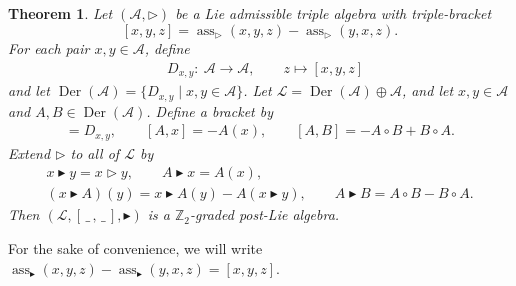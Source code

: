 \documentclass[10pt,a4paper]{amsart}
\newcommand{\Der}{\operatorname{Der}}
\newcommand{\noarg}{\,\_\,}
\numberwithin{equation}{section}
\newtheorem{Theorem}{Theorem}[section]
\begin{document}
\begin{Theorem}\label{th:pL_emb}
Let $(\mathcal{A},\rhd)$ be a Lie admissible triple algebra with triple-bracket
\[
[x,y,z] = \operatorname{ass}_{\rhd}(x,y,z) -\operatorname{ass}_{\rhd}(y,x,z).
\]
For each pair $x,y \in \mathcal{A}$, define
\begin{align*}
& D_{x,y}\colon \ \mathcal{A} \longrightarrow \mathcal{A}, \qquad
 z \longmapsto [x,y,z]
\end{align*}
and let $\Der(\mathcal{A}) = \{ D_{x,y} \mid x,y \in \mathcal{A} \}$. Let $\mathcal{L}=\Der(\mathcal{A}) \oplus \mathcal{A}$, and let $x,y \in \mathcal{A}$ and $A,B \in \Der(\mathcal{A})$. Define a bracket by
\begin{gather*}
 [x,y] = D_{x,y}, \qquad
 [A,x] = -A(x), \qquad
 [A,B] = -A \circ B + B \circ A.
\end{gather*}
Extend $\rhd$ to all of $\mathcal{L}$ by
\begin{gather*}
 x \blacktriangleright y = x \rhd y, \qquad
 A \blacktriangleright x = A(x), \\
 (x \blacktriangleright A)(y) = x \blacktriangleright A(y) - A(x\blacktriangleright y), \qquad
 A \blacktriangleright B = A \circ B - B \circ A.
\end{gather*}
Then $(\mathcal{L},[\noarg,\noarg],\blacktriangleright)$ is a $\mathbb{Z}_2$-graded post-Lie algebra.
\end{Theorem}

For the sake of convenience, we will write $\operatorname{ass}_{\blacktriangleright}(x,y,z) - \operatorname{ass}_{\blacktriangleright}(y,x,z) = [x,y,z]$.
\end{document}
